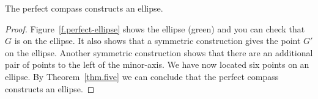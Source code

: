 \newpage

\begin{theorem}
The perfect compass constructs an ellipse.
\end{theorem}

\begin{proof}
Figure~\ref{f.perfect-ellipse} shows the ellipse (green) and you can check that $G$ is on the ellipse. It also shows that a symmetric construction gives the point $G'$ on the ellipse. Another symmetric construction shows that there are an additional pair of points to the left of the minor-axis.  We have now located six points on an ellipse. By Theorem~\ref{thm.five} we can conclude that the perfect compass constructs an ellipse.\hqed
\end{proof}


